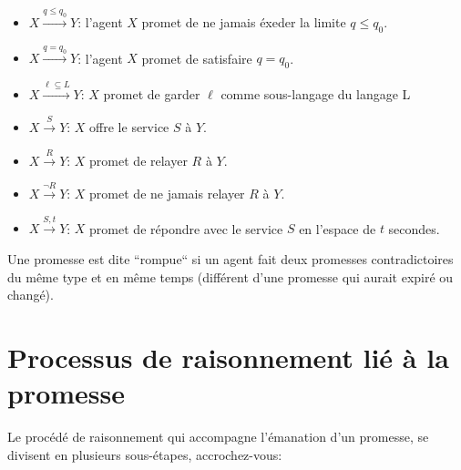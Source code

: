 \begin{itemize}
    \item $X \xrightarrow{q \leq q_0} Y $: l'agent $X$ promet de ne jamais éxeder la
        limite $q \leq q_0$.
    \item $X \xrightarrow{q = q_0} Y $: l'agent $X$ promet de satisfaire
        $q = q_0$.
    \item $X \xrightarrow{\ell \subseteq  L} Y $: $X$ promet de garder $\ell$
        comme sous-langage du langage L
    \item $X \xrightarrow{S} Y $: $X$ offre le service $S$ à $Y$.
    \item $X \xrightarrow{R} Y $: $X$ promet de relayer $R$ à $Y$.
    \item $X \xrightarrow{\neg R} Y $: $X$ promet de ne jamais relayer $R$ à $Y$.
    \item $X \xrightarrow{S,t} Y $: $X$ promet de répondre avec le service $S$
        en l'espace de $t$ secondes.
\end{itemize}

Une promesse est dite ``rompue`` si un agent fait deux promesses contradictoires du
même type et en même temps (différent d'une promesse qui aurait expiré ou changé).

\section{Processus de raisonnement lié à la promesse}

Le procédé de raisonnement qui accompagne l'émanation d'un promesse, se divisent
en plusieurs sous-étapes, accrochez-vous:

